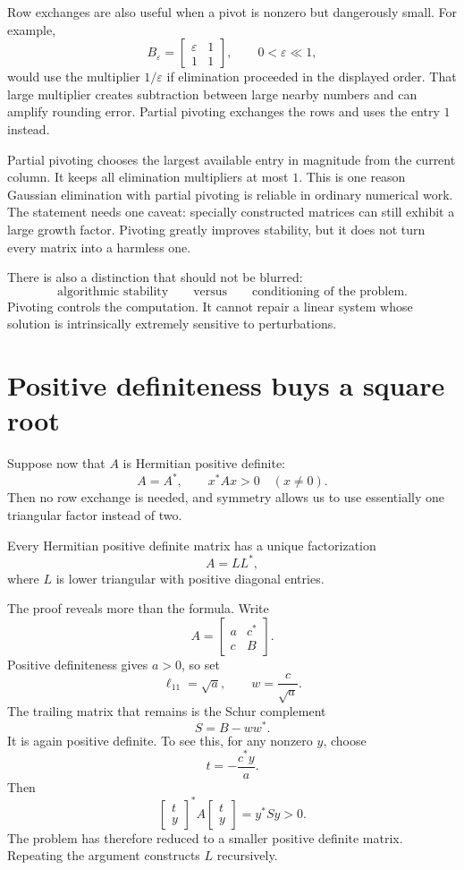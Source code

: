 Row exchanges are also useful when a pivot is nonzero but dangerously small.  For example,
\[
  B_\varepsilon=
  \begin{bmatrix}
    \varepsilon&1\\
    1&1
  \end{bmatrix},
  \qquad 0<\varepsilon\ll1,
\]
would use the multiplier \(1/\varepsilon\) if elimination proceeded in the displayed order.  That large multiplier creates subtraction between large nearby numbers and can amplify rounding error.  Partial pivoting exchanges the rows and uses the entry \(1\) instead.

Partial pivoting chooses the largest available entry in magnitude from the current column.  It keeps all elimination multipliers at most \(1\).  This is one reason Gaussian elimination with partial pivoting is reliable in ordinary numerical work.  The statement needs one caveat: specially constructed matrices can still exhibit a large growth factor.  Pivoting greatly improves stability, but it does not turn every matrix into a harmless one.

There is also a distinction that should not be blurred:
\[
  \text{algorithmic stability}
  \qquad\text{versus}\qquad
  \text{conditioning of the problem}.
\]
Pivoting controls the computation.  It cannot repair a linear system whose solution is intrinsically extremely sensitive to perturbations.

\section{Positive definiteness buys a square root}

Suppose now that \(A\) is Hermitian positive definite:
\[
  A=A^*,
  \qquad
  x^*Ax>0\quad(x\ne0).
\]
Then no row exchange is needed, and symmetry allows us to use essentially one triangular factor instead of two.

\begin{theorem}
Every Hermitian positive definite matrix has a unique factorization
\[
  A=LL^*,
\]
where \(L\) is lower triangular with positive diagonal entries.
\end{theorem}

The proof reveals more than the formula.  Write
\[
  A=
  \begin{bmatrix}
    a&c^*\\
    c&B
  \end{bmatrix}.
\]
Positive definiteness gives \(a>0\), so set
\[
  \ell_{11}=\sqrt a,
  \qquad
  w=\frac{c}{\sqrt a}.
\]
The trailing matrix that remains is the Schur complement
\[
  S=B-ww^*.
\]
It is again positive definite.  To see this, for any nonzero \(y\), choose
\[
  t=-\frac{c^*y}{a}.
\]
Then
\[
  \begin{bmatrix}t\\y\end{bmatrix}^*
  A
  \begin{bmatrix}t\\y\end{bmatrix}
  =y^*Sy>0.
\]
The problem has therefore reduced to a smaller positive definite matrix.  Repeating the argument constructs \(L\) recursively.

